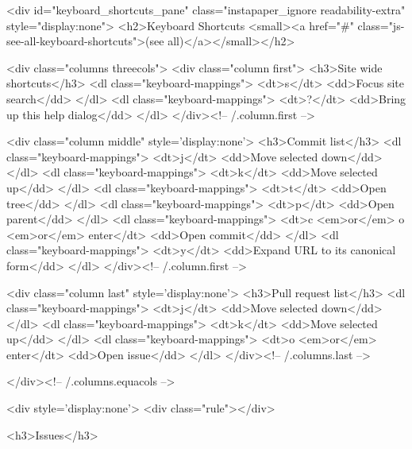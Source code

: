     

<div id="keyboard_shortcuts_pane" class="instapaper_ignore readability-extra" style="display:none">
  <h2>Keyboard Shortcuts <small><a href="#" class="js-see-all-keyboard-shortcuts">(see all)</a></small></h2>

  <div class="columns threecols">
    <div class="column first">
      <h3>Site wide shortcuts</h3>
      <dl class="keyboard-mappings">
        <dt>s</dt>
        <dd>Focus site search</dd>
      </dl>
      <dl class="keyboard-mappings">
        <dt>?</dt>
        <dd>Bring up this help dialog</dd>
      </dl>
    </div><!-- /.column.first -->

    <div class="column middle" style='display:none'>
      <h3>Commit list</h3>
      <dl class="keyboard-mappings">
        <dt>j</dt>
        <dd>Move selected down</dd>
      </dl>
      <dl class="keyboard-mappings">
        <dt>k</dt>
        <dd>Move selected up</dd>
      </dl>
      <dl class="keyboard-mappings">
        <dt>t</dt>
        <dd>Open tree</dd>
      </dl>
      <dl class="keyboard-mappings">
        <dt>p</dt>
        <dd>Open parent</dd>
      </dl>
      <dl class="keyboard-mappings">
        <dt>c <em>or</em> o <em>or</em> enter</dt>
        <dd>Open commit</dd>
      </dl>
      <dl class="keyboard-mappings">
        <dt>y</dt>
        <dd>Expand URL to its canonical form</dd>
      </dl>
    </div><!-- /.column.first -->

    <div class="column last" style='display:none'>
      <h3>Pull request list</h3>
      <dl class="keyboard-mappings">
        <dt>j</dt>
        <dd>Move selected down</dd>
      </dl>
      <dl class="keyboard-mappings">
        <dt>k</dt>
        <dd>Move selected up</dd>
      </dl>
      <dl class="keyboard-mappings">
        <dt>o <em>or</em> enter</dt>
        <dd>Open issue</dd>
      </dl>
    </div><!-- /.columns.last -->

  </div><!-- /.columns.equacols -->

  <div style='display:none'>
    <div class="rule"></div>

    <h3>Issues</h3>

